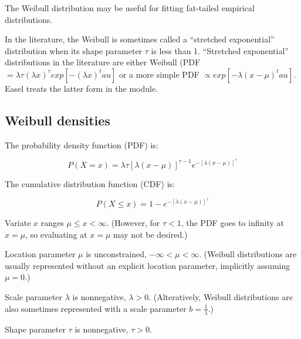 
The Weibull distribution may be useful for fitting fat-tailed
empirical distributions.

In the literature, the Weibull is sometimes called a ``stretched
exponential'' distribution when its shape parameter $\tau$ is less
than 1. ``Stretched exponential'' distributions in the literature are
either Weibull (PDF $ = \lambda \tau (\lambda x)^\tau exp\left[-
(\lambda x)^tau \right]$ or a more simple PDF $\propto exp\left[-
{\lambda(x-\mu)}^tau \right]$. Easel treats the latter form in the
 module.

\subsection{Weibull densities}

The probability density function (PDF) is:

\begin{equation}
P(X=x) = \lambda \tau [\lambda(x - \mu)]^{\tau-1} e^{- [\lambda(x-\mu)]^{\tau}}
\label{eqn:weibull_pdf}
\end{equation}

The cumulative distribution function (CDF) is:

\begin{equation}
P(X \leq x) = 1 - e^{- [\lambda(x-\mu)]^{\tau}}
\label{eqn:weibull_cdf}
\end{equation}

Variate $x$ ranges $\mu \leq x < \infty$. (However, for $\tau < 1$,
the PDF goes to infinity at $x=\mu$, so evaluating at $x=\mu$ may not
be desired.)

Location parameter $\mu$ is unconstrained, $-\infty < \mu <
\infty$. (Weibull distributions are usually represented without an
explicit location parameter, implicitly assuming $\mu = 0$.)

Scale parameter $\lambda$ is nonnegative, $\lambda >
0$. (Alteratively, Weibull distributions are also sometimes
represented with a scale parameter $b = \frac{1}{\lambda}$.)

Shape parameter $\tau$ is nonnegative, $\tau > 0$. 






